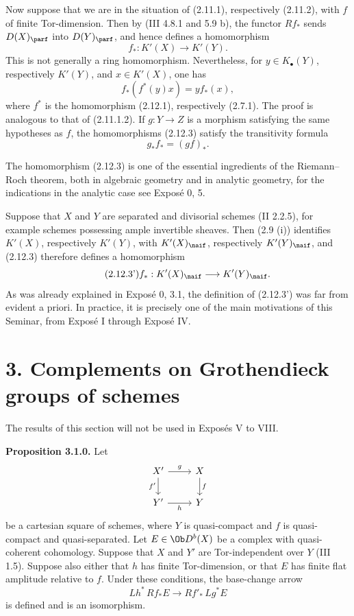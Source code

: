 \documentclass[11pt]{article}
\begin{document}
Now suppose that we are in the situation of (2.11.1), respectively (2.11.2), with \(f\) of finite Tor-dimension. Then by (III 4.8.1 and 5.9 b), the functor \(Rf_*\) sends \(D(X)_{\parf}\) into \(D(Y)_{\parf}\), and hence defines a homomorphism
\begin{equation}\tag{2.12.3}
 f_*:K'(X)\longrightarrow K'(Y).
\end{equation}
This is not generally a ring homomorphism. Nevertheless, for \(y\in K_{\bullet}(Y)\), respectively \(K'(Y)\), and \(x\in K'(X)\), one has
\begin{equation}\tag{2.12.4}
 f_*(f^*(y)x)=y f_*(x),
\end{equation}
where \(f^*\) is the homomorphism (2.12.1), respectively (2.7.1). The proof is analogous to that of (2.11.1.2). If \(g:Y\to Z\) is a morphism satisfying the same hypotheses as \(f\), the homomorphisms (2.12.3) satisfy the transitivity formula
\begin{equation}\tag{2.12.3.1}
 g_*f_*=(gf)_*.
\end{equation}

The homomorphism (2.12.3) is one of the essential ingredients of the Riemann--Roch theorem, both in algebraic geometry and in analytic geometry, for the indications in the analytic case see Exposé 0, 5.

Suppose that \(X\) and \(Y\) are separated and divisorial schemes (II 2.2.5), for example schemes possessing ample invertible sheaves. Then (2.9 (i)) identifies \(K'(X)\), respectively \(K'(Y)\), with \(K'(X)_{\naif}\), respectively \(K'(Y)_{\naif}\), and (2.12.3) therefore defines a homomorphism
\begin{equation}\tag{2.12.3'}
 f_*:K'(X)_{\naif}\longrightarrow K'(Y)_{\naif}.
\end{equation}
As was already explained in Exposé 0, 3.1, the definition of (2.12.3') was far from evident a priori. In practice, it is precisely one of the main motivations of this Seminar, from Exposé I through Exposé IV.

\section*{3. Complements on Grothendieck groups of schemes}

The results of this section will not be used in Exposés V to VIII.

\textbf{Proposition 3.1.0.} Let
\[
\begin{tikzcd}
X' \arrow[r,"g"]\arrow[d,"f'"'] & X\arrow[d,"f"]\\
Y' \arrow[r,"h"'] & Y
\end{tikzcd}
\]
be a cartesian square of schemes, where \(Y\) is quasi-compact and \(f\) is quasi-compact and quasi-separated. Let \(E\in\Ob D^b(X)\) be a complex with quasi-coherent cohomology. Suppose that \(X\) and \(Y'\) are Tor-independent over \(Y\) (III 1.5). Suppose also either that \(h\) has finite Tor-dimension, or that \(E\) has finite flat amplitude relative to \(f\). Under these conditions, the base-change arrow
\[
 Lh^*\,Rf_*E\longrightarrow Rf'_*\,Lg^*E
\]
is defined and is an isomorphism.
\end{document}
